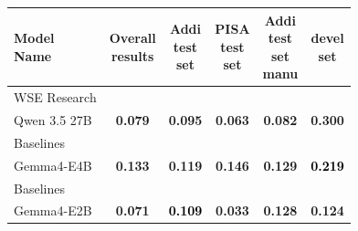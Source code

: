 \begin{tabularx}{\textwidth}{X | c c c c c}
\hline
\makecell[b]{\textbf{Model} \\ \textbf{Name}} & \makecell[b]{\textbf{Overall} \\ \textbf{results}} & \makecell[b]{\textbf{Addi} \\ \textbf{test} \\ \textbf{set}} & \makecell[b]{\textbf{PISA} \\ \textbf{test} \\ \textbf{set}} & \makecell[b]{\textbf{Addi} \\ \textbf{test} \\ \textbf{set} \\ \textbf{manu}} & \makecell[b]{\textbf{devel} \\ \textbf{set}} \\
\hline
WSE Research\\\subcatarrow{}Qwen 3.5 27B & \textbf{\textcolor{White!50!NavyBlue}{0.079}} & \textbf{\textcolor{NavyBlue}{0.095}} & \textbf{\textcolor{White!50!NavyBlue}{0.063}} & \textbf{\textcolor{NavyBlue}{0.082}} & \textbf{\textcolor{BrickRed}{0.300}} \\
Baselines\\\subcatarrow{}Gemma4-E4B & \textbf{\textcolor{BrickRed}{0.133}} & \textbf{\textcolor{BrickRed}{0.119}} & \textbf{\textcolor{BrickRed}{0.146}} & \textbf{\textcolor{BrickRed}{0.129}} & \textbf{\textcolor{Black}{0.219}} \\
Baselines\\\subcatarrow{}Gemma4-E2B & \textbf{\textcolor{NavyBlue}{0.071}} & \textbf{\textcolor{Black}{0.109}} & \textbf{\textcolor{NavyBlue}{0.033}} & \textbf{\textcolor{BrickRed}{0.128}} & \textbf{\textcolor{NavyBlue}{0.124}} \\
\hline
\end{tabularx}